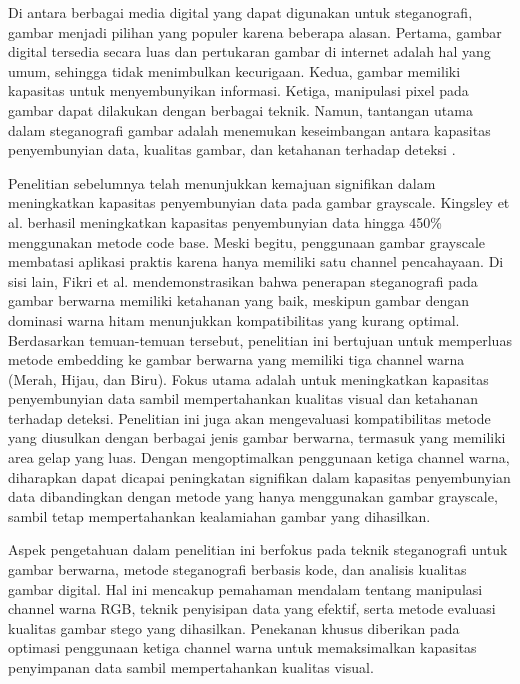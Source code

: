 \documentclass{ittelkom}
\begin{document}
{    Di antara berbagai media digital yang dapat digunakan untuk steganografi,
    gambar menjadi pilihan yang populer karena beberapa alasan. Pertama, gambar
    digital tersedia secara luas dan pertukaran gambar di internet adalah hal yang
    umum, sehingga tidak menimbulkan kecurigaan. Kedua, gambar memiliki kapasitas
    untuk menyembunyikan informasi. Ketiga, manipulasi pixel pada gambar dapat
    dilakukan dengan berbagai teknik. Namun, tantangan utama dalam steganografi
    gambar adalah menemukan keseimbangan antara kapasitas penyembunyian data,
    kualitas gambar, dan ketahanan terhadap deteksi \cite{fikri2022optimasi}.

    Penelitian sebelumnya telah menunjukkan kemajuan signifikan dalam meningkatkan
    kapasitas penyembunyian data pada gambar grayscale. Kingsley et al.
    \cite{kingsley2020improving} berhasil meningkatkan kapasitas penyembunyian data
    hingga 450\% menggunakan metode code base. Meski begitu, penggunaan gambar
    grayscale membatasi aplikasi praktis karena hanya memiliki satu channel
    pencahayaan. Di sisi lain, Fikri et al. \cite{fikri2022optimasi}
    mendemonstrasikan bahwa penerapan steganografi pada gambar berwarna memiliki
    ketahanan yang baik, meskipun gambar dengan dominasi warna hitam menunjukkan
    kompatibilitas yang kurang optimal. Berdasarkan temuan-temuan tersebut,
    penelitian ini bertujuan untuk memperluas metode embedding ke gambar berwarna
    yang memiliki tiga channel warna (Merah, Hijau, dan Biru). Fokus utama adalah
    untuk meningkatkan kapasitas penyembunyian data sambil mempertahankan kualitas
    visual dan ketahanan terhadap deteksi. Penelitian ini juga akan mengevaluasi
    kompatibilitas metode yang diusulkan dengan berbagai jenis gambar berwarna,
    termasuk yang memiliki area gelap yang luas. Dengan mengoptimalkan penggunaan
    ketiga channel warna, diharapkan dapat dicapai peningkatan signifikan dalam
    kapasitas penyembunyian data dibandingkan dengan metode yang hanya menggunakan
    gambar grayscale, sambil tetap mempertahankan kealamiahan gambar yang
    dihasilkan.

    Aspek pengetahuan dalam penelitian ini berfokus pada teknik steganografi untuk
    gambar berwarna, metode steganografi berbasis kode, dan analisis kualitas
    gambar digital. Hal ini mencakup pemahaman mendalam tentang manipulasi channel
    warna RGB, teknik penyisipan data yang efektif, serta metode evaluasi kualitas
    gambar stego yang dihasilkan. Penekanan khusus diberikan pada optimasi
    penggunaan ketiga channel warna untuk memaksimalkan kapasitas penyimpanan data
    sambil mempertahankan kualitas visual.

}
\end{document}
